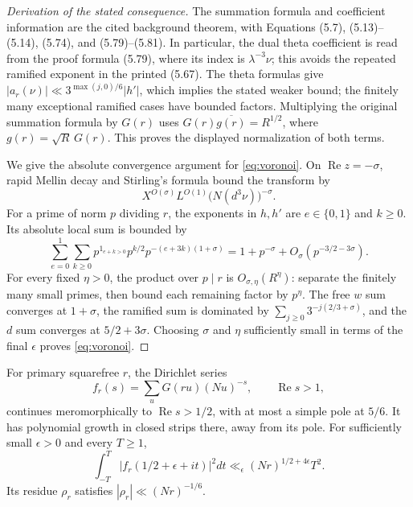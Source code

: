 \begin{proof}[Derivation of the stated consequence]
The summation formula and coefficient information are the cited
background theorem, with Equations (5.7), (5.13)--(5.14),
(5.74), and (5.79)--(5.81). In particular, the dual theta coefficient
is read from the proof formula (5.79), where its index is
$\lambda^{-3}\nu$; this avoids the repeated ramified exponent in
the printed (5.67). The theta formulas give
$|a_r(\nu)|\ll3^{\max(j,0)/6}|h'|$, which implies the stated
weaker bound; the finitely many exceptional ramified cases have bounded
factors. Multiplying the original summation formula by $G(r)$ uses
$G(r)\overline{g(r)}=R^{1/2}$, where $g(r)=\sqrt R\,G(r)$.
This proves the displayed normalization of both terms.

We give the absolute convergence argument for \eqref{eq:voronoi}.
On $\operatorname{Re}z=-\sigma$, rapid Mellin decay and Stirling's
formula bound the transform by
\[
 X^{O(\sigma)}L^{O(1)}
              \bigl(N(d^3\nu)\bigr)^{-\sigma}.
\]
For a prime of norm $p$ dividing $r$, the exponents in $h,h'$ are
$e\in\{0,1\}$ and $k\ge0$. Its absolute local sum is bounded by
\[
 \sum_{e=0}^1\sum_{k\ge0}
 p^{1_{e+k>0}}p^{k/2}p^{-(e+3k)(1+\sigma)}
 =1+p^{-\sigma}+O_\sigma(p^{-3/2-3\sigma}).
\]
For every fixed $\eta>0$, the product over $p\mid r$ is
$O_{\sigma,\eta}(R^\eta)$: separate the finitely many small primes,
then bound each remaining factor by $p^\eta$.
The free $w$ sum converges at $1+\sigma$, the ramified sum is dominated
by $\sum_{j\ge0}3^{-j(2/3+\sigma)}$, and the $d$ sum converges at
$5/2+3\sigma$.
Choosing $\sigma$ and $\eta$ sufficiently small in terms of the final
$\epsilon$ proves \eqref{eq:voronoi}.
\end{proof}

\begin{theorem}
\label{thm:hb-height}
For primary squarefree $r$, the Dirichlet series
\[
 f_r(s)=\sum_u G(ru)(Nu)^{-s},\qquad \operatorname{Re}s>1,
\]
continues meromorphically to $\operatorname{Re}s>1/2$, with at most
a simple pole at $5/6$. It has polynomial growth in closed strips
there, away from its pole. For sufficiently small $\epsilon>0$ and
every $T\ge1$,
\begin{equation}
 \int_{-T}^T|f_r(1/2+\epsilon+it)|^2dt
 \ll_\epsilon (Nr)^{1/2+4\epsilon}T^2.
 \label{eq:hb-mean-square}
\end{equation}
Its residue $\rho_r$ satisfies $|\rho_r|\ll (Nr)^{-1/6}$.
\end{theorem}

